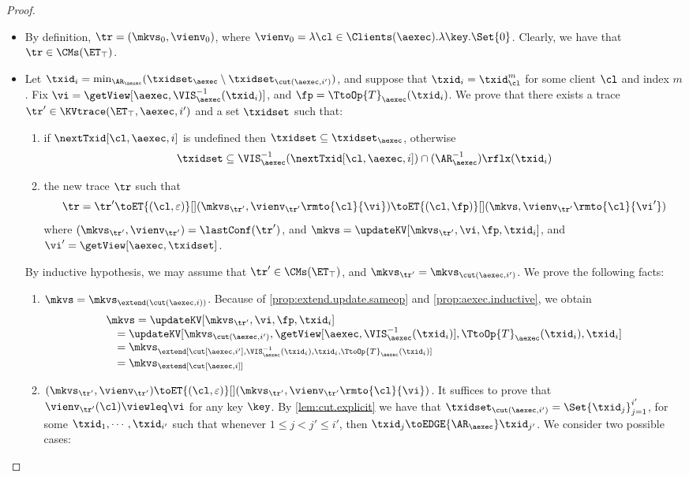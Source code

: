 \begin{proof}
\begin{itemize}
\item {} By definition, $\tr = (\mkvs_{0}, \vienv_{0})$, 
where $\vienv_{0} = \lambda \cl \in \Clients(\aexec). \lambda \key.\Set{0}$. 
Clearly, we have that $\tr \in \CMs(\ET_{\top})$. 
\item {} Let $\txid_{i} = \min_{\AR_{\aexec}}(\txidset_{\aexec} \setminus \txidset_{\cut(\aexec, i')})$, 
and suppose that $\txid_{i} = \txid_{\cl}^{m}$ for some client $\cl$ and index $m$. 
Fix $\vi = \getView[\aexec, \VIS_{\aexec}^{-1}(\txid_{i})]$, and  $\fp = \TtoOp{T}_{\aexec}(\txid_{i})$.
We prove that there exists a trace $\tr' \in \KVtrace(\ET_{\top}, \aexec, i')$ and a set 
$\txidset$ such that: 
\begin{enumerate}
\item if $\nextTxid[\cl, \aexec, i]$ is undefined then $\txidset \subseteq \txidset_{\aexec}$, otherwise 
\[
    \txidset \subseteq \VIS^{-1}_{\aexec}(\nextTxid[\cl, \aexec, i]) \cap (\AR_{\aexec}^{-1})\rflx(\txid_{i})
\]
\item the new trace \( \tr \) such that
\[
    \tr = \tr' \toET{(\cl, \varepsilon)}[] (\mkvs_{\tr'}, \vienv_{\tr'}\rmto{\cl}{\vi}) \toET{(\cl, \fp)}[] 
(\mkvs,  \vienv_{\tr'}\rmto{\cl}{\vi'})
\]
where $(\mkvs_{\tr'}, \vienv_{\tr'}) = \lastConf(\tr')$, and $\mkvs = \updateKV[\mkvs_{\tr'}, \vi, \fp, \txid_{i}]$, 
and $\vi' = \getView[\aexec, \txidset]$.
\end{enumerate}
By inductive hypothesis, we may assume that $\tr' \in \CMs(\ET_{\top})$, and $\mkvs_{\tr'} = \mkvs_{\cut(\aexec, i')}$. 
We prove the following facts: 
\begin{enumerate}
\item $\mkvs = \mkvs_{\extend(\cut(\aexec, i))}$. 
Because of \cref{prop:extend.update.sameop} and \cref{prop:aexec.inductive},
we obtain 
\[
\begin{array}{l}
\mkvs = \updateKV[\mkvs_{\tr'}, \vi, \fp, \txid_{i}] \\
\quad = \updateKV[\mkvs_{\cut(\aexec, i')}, \getView[\aexec, \VIS^{-1}_{\aexec}(\txid_{i})], \TtoOp{T}_{\aexec}(\txid_{i}), \txid_{i}] \\
\quad = \mkvs_{\extend[\cut[\aexec, i'], \VIS^{-1}_{\aexec}(\txid_{i}), \txid_{i}, \TtoOp{T}_{\aexec}(\txid_{i})] } \\
\quad = \mkvs_{\extend[\cut[\aexec, i]]}
\end{array}
\]

\item $(\mkvs_{\tr'}, \vienv_{\tr'}) \toET{(\cl, \varepsilon)}[] (\mkvs_{\tr'}, \vienv_{\tr'}\rmto{\cl}{\vi})$. 
It suffices to prove that $\vienv_{\tr'}(\cl) \viewleq \vi$ for any key $\key$.
By \cref{lem:cut.explicit} we have that $\txidset_{\cut(\aexec, i')} = \Set{\txid_{j}}_{j=1}^{i'}$, for 
some $\txid_{1},\cdots, \txid_{i'}$ such that whenever $1 \leq j < j' \leq i'$, then 
$\txid_{j} \toEDGE{\AR_{\aexec}} \txid_{j'}$. We consider two possible cases: 


\end{enumerate}
\end{itemize}
\end{proof}
